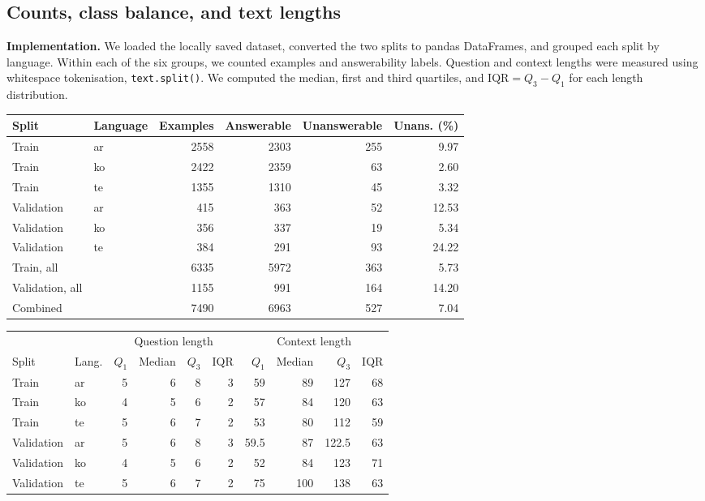 \documentclass[11pt,a4paper]{article}
\begin{document}
\subsection{Counts, class balance, and text lengths}
\textbf{Implementation.} We loaded the locally saved dataset, converted the two splits to pandas DataFrames, and grouped each split by language. Within each of the six groups, we counted examples and answerability labels. Question and context lengths were measured using whitespace tokenisation, \texttt{text.split()}. We computed the median, first and third quartiles, and $\mathrm{IQR}=Q_3-Q_1$ for each length distribution.

\begin{center}
\small
\begin{tabular}{llrrrr}
\toprule
Split & Language & Examples & Answerable & Unanswerable & Unans. (\%) \\
\midrule
Train & ar & 2558 & 2303 & 255 & 9.97 \\
Train & ko & 2422 & 2359 & 63 & 2.60 \\
Train & te & 1355 & 1310 & 45 & 3.32 \\
Validation & ar & 415 & 363 & 52 & 12.53 \\
Validation & ko & 356 & 337 & 19 & 5.34 \\
Validation & te & 384 & 291 & 93 & 24.22 \\
\midrule
Train, all & & 6335 & 5972 & 363 & 5.73 \\
Validation, all & & 1155 & 991 & 164 & 14.20 \\
Combined & & 7490 & 6963 & 527 & 7.04 \\
\bottomrule
\end{tabular}
\end{center}

\begin{center}
\small
\begin{tabular}{llrrrrrrrr}
\toprule
& & \multicolumn{4}{c}{Question length} & \multicolumn{4}{c}{Context length} \\
\cmidrule(lr){3-6}\cmidrule(lr){7-10}
Split & Lang. & $Q_1$ & Median & $Q_3$ & IQR & $Q_1$ & Median & $Q_3$ & IQR \\
\midrule
Train & ar & 5 & 6 & 8 & 3 & 59 & 89 & 127 & 68 \\
Train & ko & 4 & 5 & 6 & 2 & 57 & 84 & 120 & 63 \\
Train & te & 5 & 6 & 7 & 2 & 53 & 80 & 112 & 59 \\
Validation & ar & 5 & 6 & 8 & 3 & 59.5 & 87 & 122.5 & 63 \\
Validation & ko & 4 & 5 & 6 & 2 & 52 & 84 & 123 & 71 \\
Validation & te & 5 & 6 & 7 & 2 & 75 & 100 & 138 & 63 \\
\bottomrule
\end{tabular}
\end{center}
\end{document}
